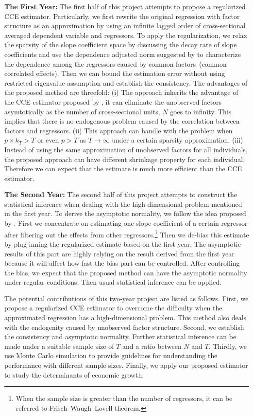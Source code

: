 \documentclass[11pt,a4paper]{article}
\theoremstyle{definition}
\begin{document}
\noindent
\textbf{The First Year:} The first half of this project attempts to propose a regularized CCE estimator. Particularly, we first rewrite the original regression with factor structure as an approximation by using an infinite lagged order of cross-sectional averaged dependent variable and regressors. To apply the regularization, we relax the sparsity of the slope coefficient space by discussing the decay rate of slope coefficients and use the dependence adjusted norm suggested by \citet{Han2020} to characterize the dependence among the regressors caused by common factors~(common correlated effects).  Then we can bound the estimation error without using restricted eigenvalue assumption and establish the consistency. The advantages of the proposed method are threefold: (i) The  approach inherits the advantage of the CCE estimator proposed by \citet{Chudik2015}, it can eliminate the unobserved factors asymtotically as the number of cross-sectional units, $N$ goes to infinity. This implies that there is no endogenous problem caused by the correlation between factors and regressors. (ii) This approach can handle with the problem when  $p\times k_T>T$ or even $p>T$ as $T\rightarrow\infty$ under a certain sparsity approximation. (iii) Instead of using the same approximation of unobserved factors  for all individuals, the proposed approach can have different shrinkage property for each individual. Therefore we can expect that the estimate is much more efficient than the CCE estimator.

\noindent
\textbf{The Second Year:} The second half of this project attempts to construct the statistical inference when dealing with the high-dimensional problem mentioned in the first year. To derive the asymptotic normality, we follow the idea proposed by \citet{Zhang2014}. First we concentrate on estimating one slope coefficient of a certain regressor after filtering out the effects from other regressors.\footnote{When the sample size is greater than the number of regressors, it can be referred to Frisch--Waugh--Lovell theorem.} Then we de-bias this estimate by plug-inning the regularized estimate based on the first year. The asymptotic results of this part are highly relying on the result derived from the first year because it will affect how fast the bias part can be controlled. After controlling the bias, we expect that the proposed method can have the asymptotic normality under regular conditions. Then usual statistical inference can be applied.

The potential contributions of this two-year project are listed as follows. First, we propose a regularized CCE estimator to overcome the difficulty when the approximated regression has a high-dimensional problem. This method also deals with the endogenity caused by unobserved factor structure. Second, we establish the consistency and asymptotic normality. Further statistical inference can be made under a suitable sample size of $T$ and a ratio between $N$ and $T$. Thirdly, we use Monte Carlo simulation to provide guidelines for understanding the performance with different sample sizes. Finally, we apply our proposed estimator to study the determinants of economic growth. 
\end{document}
